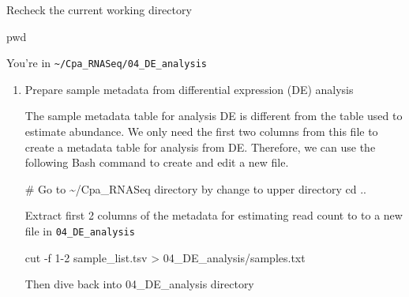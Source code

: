 \documentclass[
  letterpaper,
  DIV=11,
  numbers=noendperiod]{scrreprt}
\newenvironment{Shaded}{\begin{snugshade}}{\end{snugshade}}
\newcommand{\AttributeTok}[1]{\textcolor[rgb]{0.40,0.45,0.13}{#1}}
\newcommand{\BuiltInTok}[1]{\textcolor[rgb]{0.00,0.23,0.31}{#1}}
\newcommand{\CommentTok}[1]{\textcolor[rgb]{0.37,0.37,0.37}{#1}}
\newcommand{\FunctionTok}[1]{\textcolor[rgb]{0.28,0.35,0.67}{#1}}
\newcommand{\NormalTok}[1]{\textcolor[rgb]{0.00,0.23,0.31}{#1}}
\newcommand{\OperatorTok}[1]{\textcolor[rgb]{0.37,0.37,0.37}{#1}}
\begin{document}
\begin{tcolorbox}[enhanced jigsaw, breakable, bottomrule=.15mm, left=2mm, coltitle=black, opacityback=0, colframe=quarto-callout-note-color-frame, toprule=.15mm, opacitybacktitle=0.6, colbacktitle=quarto-callout-note-color!10!white, bottomtitle=1mm, colback=white, toptitle=1mm, titlerule=0mm, rightrule=.15mm, arc=.35mm, title=\textcolor{quarto-callout-note-color}{\faInfo}\hspace{0.5em}{Activity}, leftrule=.75mm]

Recheck the current working directory

\begin{Shaded}
\begin{Highlighting}[]
\BuiltInTok{pwd}
\end{Highlighting}
\end{Shaded}

You're in \texttt{\textasciitilde{}/Cpa\_RNASeq/04\_DE\_analysis}

\begin{enumerate}
\def\labelenumi{\arabic{enumi}.}
\item
  Prepare sample metadata from differential expression (DE) analysis

  The sample metadata table for analysis DE is different from the table
  used to estimate abundance. We only need the first two columns from
  this file to create a metadata table for analysis from DE. Therefore,
  we can use the following Bash command to create and edit a new file.

\begin{Shaded}
\begin{Highlighting}[]
\CommentTok{\# Go to \textasciitilde{}/Cpa\_RNASeq directory by change to upper directory}
\BuiltInTok{cd}\NormalTok{ ..}
\end{Highlighting}
\end{Shaded}

  Extract first 2 columns of the metadata for estimating read count to
  to a new file in \texttt{04\_DE\_analysis}

\begin{Shaded}
\begin{Highlighting}[]
\FunctionTok{cut} \AttributeTok{{-}f}\NormalTok{ 1{-}2 sample\_list.tsv }\OperatorTok{\textgreater{}}\NormalTok{ 04\_DE\_analysis/samples.txt}
\end{Highlighting}
\end{Shaded}

  Then dive back into 04\_DE\_analysis directory


\end{enumerate}
\end{tcolorbox}
\end{document}
